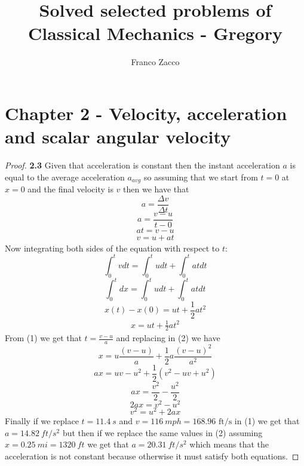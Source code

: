 \documentclass[11pt]{article}
\title{\textbf{Solved selected problems of Classical Mechanics - Gregory}}
\author{Franco Zacco}
\date{}
\begin{document}
\maketitle
\thispagestyle{empty}

\section*{Chapter 2 - Velocity, acceleration and scalar angular velocity}

	\begin{proof}{\textbf{2.3}} Given that acceleration is constant then the
        instant acceleration $a$ is equal to the average acceleration $a_{avg}$
        so assuming that we start from $t=0$ at $x=0$ and the final velocity
        is $v$ then we have that
        $$a = \frac{\Delta v}{\Delta t}$$
        $$a = \frac{v - u}{t - 0}$$
        $$at = v - u$$
        \begin{align}
            v = u + at
        \end{align}
        Now integrating both sides of the equation with respect to $t$:
        $$\int_0^t{vdt}=\int_0^t{udt}+\int_0^t{atdt}$$
        $$\int_{0}^t{dx}=\int_0^t{udt}+\int_0^t{atdt}$$
        $$x(t) - x(0) = ut + \frac{1}{2}at^2$$
        \begin{align}
            x = ut + \frac{1}{2}at^2
        \end{align}
        From (1) we get that $t = \frac{v-u}{a}$ and replacing in (2) we have
        $$x = u\frac{(v-u)}{a} + \frac{1}{2}a\frac{(v-u)^2}{a^2}$$
        $$ax = uv - u^2 + \frac{1}{2}(v^2 - uv + u^2)$$
        $$ax = \frac{v^2}{2} - \frac{u^2}{2}$$
        $$2ax = v^2 - u^2$$
        $$v^2 = u^2 + 2ax$$
        Finally if we replace $t=11.4~\si{s}$ and
        $v=116~\si{mph}=168.96\text{ ft/s}$ in (1) we get that
        $a = 14.82~\si{ ft/s^2}$ but then if we replace the same values in (2)
        assuming $x=0.25~\si{mi} =1320~\si{ft}$ we get that
        $a = 20.31~\si{ft/s^2}$ which means that the acceleration is not 
        constant because otherwise it must satisfy both equations.
    \end{proof}
\end{document}
